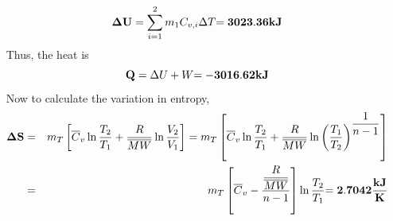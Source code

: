 \documentclass[calculator,steamtables,allquestions,datasheet,resit,solutions]{exam_newMarcus2}
\newcommand{\frc}{\displaystyle\frac}
\begin{document}
\begin{question}
{\begin{displaymath}
{\bf \Delta U} = \sum\limits_{i=1}^{2} m_{1}C_{v,i} \Delta T {\bf = 3023.36 kJ}
\end{displaymath}~
Thus, the heat is 
\begin{displaymath}
{\bf Q} =\Delta U + W {\bf = -3016.62 kJ}
\end{displaymath}~
Now to calculate the variation in entropy,
\begin{eqnarray}
{\bf \Delta S} &=& m_{T}\left[\overline{C}_{v}\ln\frc{T_{2}}{T_{1}}+\frc{R}{\overline{MW}}\ln\frc{V_{2}}{V_{1}}\right] = m_{T}\left[\overline{C}_{v}\ln\frc{T_{2}}{T_{1}}+\frc{R}{\overline{MW}}\ln\left(\frc{T_{1}}{T_{2}}\right)^{\frc{1}{n-1}}\right]\nonumber  \nonumber \\
               &=& m_{T}\left[\overline{C}_{v}-\frc{\frc{R}{\overline{MW}}}{n-1}\right]\ln\frc{T_{2}}{T_{1}} {\bf = 2.7042 \frc{kJ}{K}}\nonumber 
\end{eqnarray}~
}

\end{question}

\clearpage
\end{document}
